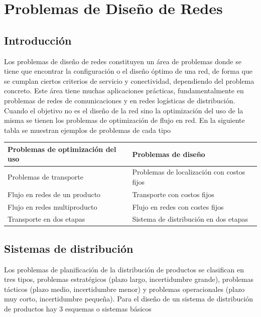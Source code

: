 \section{Problemas de Diseño de Redes}

\subsection{Introducción}

Los problemas de diseño de redes constituyen un área de problemas donde se tiene que encontrar la configuración o el diseño
óptimo de una red, de forma que se cumplan ciertos criterios de servicio y conectividad, dependiendo del problema concreto.
Este área tiene muchas aplicaciones prácticas, fundamentalmente en problemas de redes de comunicaciones y en redes logísticas
de distribución. Cuando el objetivo no es el diseño de la red sino la optimización del uso de la misma se tienen los problemas
de optimización de flujo en red. En la siguiente tabla se muestran ejemplos de problemas de cada tipo

\begin{table}[h!]
    \centering
    \begin{tabular}{l|l}
        \textbf{Problemas de optimización del uso} & \textbf{Problemas de diseño} \\ \hline
        Problemas de transporte & Problemas de localización con costos fijos \\
        Flujo en redes de un producto & Transporte con costos fijos \\
        Flujo en redes multiproducto & Flujo en redes con costes fijos \\
        Transporte en dos etapas & Sistema de distribución en dos etapas
    \end{tabular}
\end{table}

\subsection{Sistemas de distribución}

Los problemas de planificación de la distribución de productos se clasifican en tres tipos, problemas estratégicos (plazo
largo, incertidumbre grande), problemas tácticos (plazo medio, incertidumbre menor) y problemas operacionales (plazo muy
corto, incertidumbre pequeña). Para el diseño de un sistema de distribución de productos hay 3 esquemas o sistemas básicos

